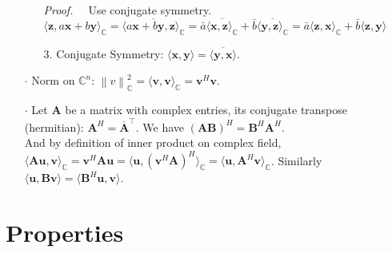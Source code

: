 \documentclass[a4paper, 11pt]{article}
\begin{document}
\begin{itemize}
\begin{itemize}
$$		$$
		\textit{Proof.~~} Use conjugate symmetry. $\langle \bm{z}, a\bm{x}+b\bm{y} \rangle_{\mathbb{C}} 
		= \overline{\langle a \bm{x}+b\bm{y}, \bm{z} \rangle_{\mathbb{C}}}
		=\bar{a}\overline{\langle \bm{x}, \bm{z} \rangle_{\mathbb{C}}}+\bar{b}\overline{\langle \bm{y}, \bm{z} \rangle_{\mathbb{C}}} 
		=\bar{a} \langle \bm{z}, \bm{x} \rangle_{\mathbb{C}} + \bar{b}\langle \bm{z}, \bm{y} \rangle$
		\item[3.] Conjugate Symmetry: $\langle \bm{x}, \bm{y} \rangle = \overline{\langle \bm{y}, \bm{x} \rangle}$.
	\end{itemize}
	\item[$\cdot$] Norm on $\mathbb{C}^n$: $\left\|v\right\|^2_{\mathbb{C}} = \langle \bm{v}, \bm{v} \rangle_{\mathbb{C}}=\bm{v}^H \bm{v}$.
	\item[$\cdot$] Let $\bm{A}$ be a matrix with complex entries, its conjugate transpose (hermitian): $\bm{A}^H = \overline{\bm{A}}^{\top}$. We have $(\bm{AB})^H = \bm{B}^H \bm{A}^H$. \\
	And by definition of inner product on complex field, $\langle \bm{Au}, \bm{v} \rangle_{\mathbb{C}} = \bm{v}^H\bm{Au}=\langle \bm{u}, (\bm{v}^H \bm{A})^H \rangle_{\mathbb{C}} = \langle \bm{u}, \bm{A}^H \bm{v} \rangle_{\mathbb{C}}$. Similarly $\langle \bm{u}, \bm{Bv} \rangle = \langle \bm{B}^H \bm{u}, \bm{v} \rangle$.
\end{itemize}


\section{Properties}
\end{document}
